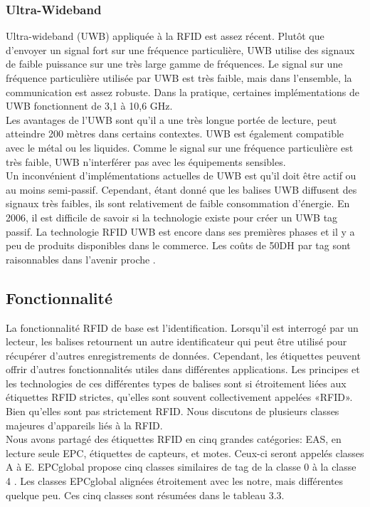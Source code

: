 \documentclass[11pt, a4paper, twoside]{book}
\begin{document}
\subsubsection{Ultra-Wideband}
Ultra-wideband (UWB) appliquée à la RFID est assez récent. Plutôt que d'envoyer un signal fort sur une fréquence particulière, UWB utilise des signaux de faible puissance sur une très large gamme de fréquences. Le signal sur une fréquence particulière utilisée par UWB est très faible, mais dans l'ensemble, la communication est assez robuste. Dans la pratique, certaines implémentations de UWB fonctionnent de 3,1 à 10,6 GHz.\\

Les avantages de l'UWB sont qu'il a une très longue portée de lecture, peut atteindre 200 mètres dans certains contextes. UWB est également compatible avec le métal ou les liquides. Comme le signal sur une fréquence particulière est très faible, UWB n'interférer pas avec les équipements sensibles.\\

Un inconvénient d'implémentations actuelles de UWB est qu'il doit être actif ou au moins semi-passif. Cependant, étant donné que les balises UWB diffusent des signaux très faibles, ils sont relativement de faible consommation d'énergie. En 2006, il est difficile de savoir si la technologie existe pour créer un UWB tag passif.
La technologie RFID UWB est encore dans ses premières phases et il y a peu de produits disponibles dans le commerce. Les coûts de 50DH par tag sont raisonnables dans l'avenir proche .
\subsection{Fonctionnalité}
La fonctionnalité RFID de base est l'identification. Lorsqu'il est interrogé par un lecteur, les balises retournent un autre identificateur qui peut être utilisé pour récupérer d'autres enregistrements de données. Cependant, les étiquettes peuvent offrir d'autres fonctionnalités utiles dans différentes applications. Les principes et les technologies de ces différentes types de balises  sont si étroitement liées aux étiquettes RFID strictes, qu'elles sont souvent collectivement appelées «RFID». Bien qu'elles sont pas strictement RFID. Nous discutons de plusieurs classes majeures d'appareils liés à la RFID.\\

Nous avons partagé des étiquettes RFID en cinq grandes catégories: EAS, en lecture seule EPC, étiquettes de capteurs, et motes. Ceux-ci seront appelés classes A à E. EPCglobal propose cinq classes similaires de tag de la classe 0 à la classe 4 . Les classes EPCglobal alignées étroitement avec les notre, mais différentes quelque peu. Ces cinq classes sont résumées dans le tableau 3.3.
\end{document}
